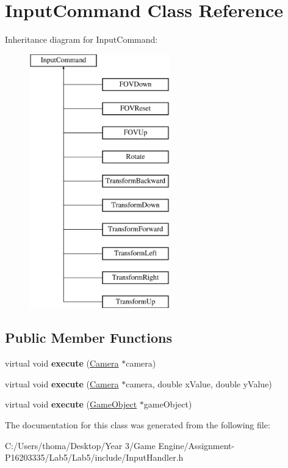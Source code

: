 \hypertarget{class_input_command}{}\section{Input\+Command Class Reference}
\label{class_input_command}
Inheritance diagram for Input\+Command\+:\begin{figure}[H]
\begin{center}
\leavevmode
\includegraphics[height=11.000000cm]{class_input_command}
\end{center}
\end{figure}
\subsection*{Public Member Functions}
\begin{DoxyCompactItemize}
\item 
\mbox{\label{class_input_command_ac1d3cb9c72fc0b0dcd717c3f9689e370}} 
virtual void {\bfseries execute} (\mbox{\hyperlink{class_camera}{Camera}} $\ast$camera)
\item 
\mbox{\label{class_input_command_a49bad0c58feefc574ea2648682e108cb}} 
virtual void {\bfseries execute} (\mbox{\hyperlink{class_camera}{Camera}} $\ast$camera, double x\+Value, double y\+Value)
\item 
\mbox{\label{class_input_command_a7d15f8930f640bb8c619698dae9cf25b}} 
virtual void {\bfseries execute} (\mbox{\hyperlink{class_game_object}{Game\+Object}} $\ast$game\+Object)
\end{DoxyCompactItemize}


The documentation for this class was generated from the following file\+:\begin{DoxyCompactItemize}
\item 
C\+:/\+Users/thoma/\+Desktop/\+Year 3/\+Game Engine/\+Assignment-\/\+P16203335/\+Lab5/\+Lab5/include/Input\+Handler.\+h\end{DoxyCompactItemize}
